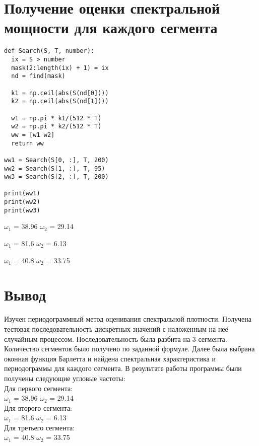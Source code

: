 \documentclass[12pt]{article}
\begin{document}
\section{Получение оценки спектральной мощности для каждого сегмента}

\begin{lstlisting}
def Search(S, T, number):
  ix = S > number
  mask(2:length(ix) + 1) = ix
  nd = find(mask)

  k1 = np.ceil(abs(S(nd[0])))
  k2 = np.ceil(abs(S(nd[1])))

  w1 = np.pi * k1/(512 * T)
  w2 = np.pi * k2/(512 * T)
  ww = [w1 w2]
  return ww

ww1 = Search(S[0, :], T, 200)
ww2 = Search(S[1, :], T, 95)
ww3 = Search(S[2, :], T, 200)

print(ww1)
print(ww2)
print(ww3)
\end{lstlisting}


$\omega_1$ = 38.96  
$\omega_2$ = 29.14

$\omega_1$ = 81.6
$\omega_2$ = 6.13

$\omega_1$ = 40.8   
$\omega_2$ = 33.75

\section{Вывод}
Изучен периодограммный метод оценивания спектральной плотности. Получена тестовая последовательность дискретных значений с наложенным на неё случайным процессом. Последовательность была разбита на 3 сегмента. Количество сегментов было получено по заданной формуле. Далее была выбрана оконная функция Барлетта и найдена спектральная характеристика и периодограммы для каждого сегмента.
В результате работы программы были получены следующие угловые частоты:\\

Для первого сегмента:\\
$\omega_1$ = 38.96  
$\omega_2$ = 29.14\\

Для второго сегмента:\\
$\omega_1$ = 81.6
$\omega_2$ = 6.13\\

Для третьего сегмента:\\
$\omega_1$ = 40.8   
$\omega_2$ = 33.75
\end{document}
